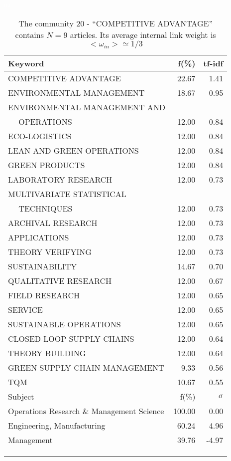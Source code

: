\documentclass[a4paper,11pt]{report}
\begin{document}
\begin{landscape}
\clearpage

\begin{table}[!ht]
\caption{The community 20 - ``COMPETITIVE ADVANTAGE'' contains $N = 9$ articles. Its average internal link weight is $<\omega_{in}> \simeq 1/3$ }
\textcolor{white}{aa}\\
{\scriptsize\begin{tabular}{|l r  r|}
\hline
Keyword & f(\%) & tf-idf \\
\hline
COMPETITIVE ADVANTAGE & 22.67 & 1.41\\
ENVIRONMENTAL MANAGEMENT & 18.67 & 0.95\\
ENVIRONMENTAL MANAGEMENT AND &  &\\
$\quad$ OPERATIONS & 12.00 & 0.84\\
ECO-LOGISTICS & 12.00 & 0.84\\
LEAN AND GREEN OPERATIONS & 12.00 & 0.84\\
GREEN PRODUCTS & 12.00 & 0.84\\
LABORATORY RESEARCH & 12.00 & 0.73\\
MULTIVARIATE STATISTICAL &  &\\
$\quad$ TECHNIQUES & 12.00 & 0.73\\
ARCHIVAL RESEARCH & 12.00 & 0.73\\
APPLICATIONS & 12.00 & 0.73\\
THEORY VERIFYING & 12.00 & 0.73\\
SUSTAINABILITY & 14.67 & 0.70\\
QUALITATIVE RESEARCH & 12.00 & 0.67\\
FIELD RESEARCH & 12.00 & 0.65\\
SERVICE & 12.00 & 0.65\\
SUSTAINABLE OPERATIONS & 12.00 & 0.65\\
CLOSED-LOOP SUPPLY CHAINS & 12.00 & 0.64\\
THEORY BUILDING & 12.00 & 0.64\\
GREEN SUPPLY CHAIN MANAGEMENT & 9.33 & 0.56\\
TQM & 10.67 & 0.55\\
\hline
\hline
Subject & f(\%) & $\sigma$\\
\hline
Operations Research \& Management Science & 100.00 & 0.00\\
Engineering, Manufacturing & 60.24 & 4.96\\
Management & 39.76 & -4.97\\
 &  & \\
 &  & \\
 &  & \\

\end{tabular}}
\end{table}
\end{landscape}
\end{document}
